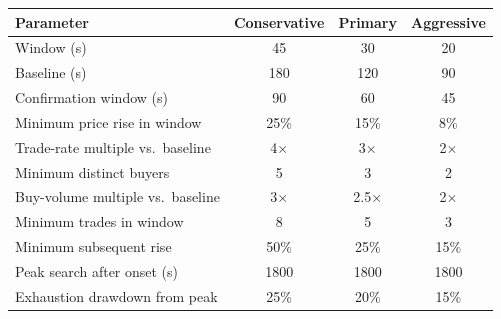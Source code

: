 \begin{tabular}{lccc}
\toprule
Parameter & Conservative & Primary & Aggressive \\
\midrule
Window (s) & 45 & 30 & 20 \\
Baseline (s) & 180 & 120 & 90 \\
Confirmation window (s) & 90 & 60 & 45 \\
Minimum price rise in window & 25\% & 15\% & 8\% \\
Trade-rate multiple vs.\ baseline & 4$\times$ & 3$\times$ & 2$\times$ \\
Minimum distinct buyers & 5 & 3 & 2 \\
Buy-volume multiple vs.\ baseline & 3$\times$ & 2.5$\times$ & 2$\times$ \\
Minimum trades in window & 8 & 5 & 3 \\
Minimum subsequent rise & 50\% & 25\% & 15\% \\
Peak search after onset (s) & 1800 & 1800 & 1800 \\
Exhaustion drawdown from peak & 25\% & 20\% & 15\% \\
\bottomrule
\end{tabular}
